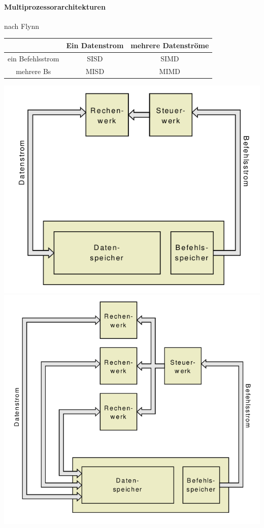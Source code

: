 \documentclass[10pt,landscape]{article}
\begin{document}
\begin{multicols}{3}
  \paragraph{Multiprozessorarchitekturen}
  nach Flynn
  \begin{center}
    \begin{tabular}{ c | c | c}
                       & Ein Datenstrom & mehrere Datenströme \\\hline
      ein Befehlsstrom & SISD           & SIMD                \\
      mehrere Bs       & MISD           & MIMD 
    \end{tabular}
  \end{center}
  \begin{center}
    \includegraphics[width=\textwidth/13]{Assets/RA2_SISD.png}
    \includegraphics[width=\textwidth/13]{Assets/RA2_SIMD.png}

\end{center}
\end{multicols}
\end{document}

